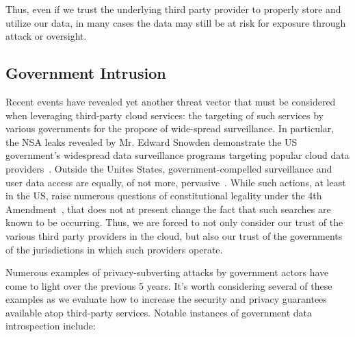 Thus, even if we trust the underlying third party provider to properly
store and utilize our data, in many cases the data may still be at
risk for exposure through attack or oversight.

\subsection{Government Intrusion}

Recent events have revealed yet another threat vector that must be
considered when leveraging third-party cloud services: the targeting
of such services by various governments for the propose of wide-spread
surveillance. In particular, the NSA leaks revealed by Mr. Edward
Snowden demonstrate the US government's widespread data surveillance
programs targeting popular cloud data
providers~\cite{greenwald-prism}.  Outside the Unites States,
government-compelled surveillance and user data access are equally, of
not more, pervasive~\cite{netfreedom2015}.  While such
actions, at least in the US, raise numerous questions of
constitutional legality under the 4th
Amendment~\cite{us-constitution-amend4}, that does not at present
change the fact that such searches are known to be occurring. Thus, we
are forced to not only consider our trust of the various third party
providers in the cloud, but also our trust of the governments of the
jurisdictions in which such providers operate.

Numerous examples of privacy-subverting attacks by government actors
have come to light over the previous 5 years. It's worth considering
several of these examples as we evaluate how to increase the security
and privacy guarantees available atop third-party services. Notable
instances of government data introspection include:

